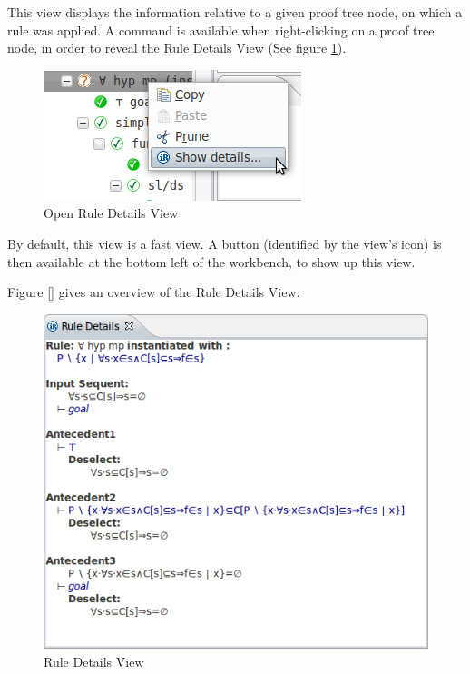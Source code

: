 This view displays the information relative to a given proof tree node, on which a rule was applied.
A command is available when right-clicking on a proof tree node, in order to reveal the \textsf{Rule Details View} (See figure \ref{fig_ref_01_proving_perspective9}).

\begin{figure}[!h]
\begin{center}
	\includegraphics{img/reference/ref_01_proving_perspective9.png}
	\caption{Open Rule Details View}
	\label{fig_ref_01_proving_perspective9}
\end{center}
\end{figure}

By default, this view is a fast view. A button (identified by the view's icon) is then available at the bottom left of the workbench, to show up this view.

Figure \ref{} gives an overview of the \textsf{Rule Details View}.

\begin{figure}[!h]
\begin{center}
	\includegraphics{img/reference/ref_01_proving_perspective10.png}
	\caption{Rule Details View}
	\label{fig_ref_01_proving_perspective10}
\end{center}
\end{figure}

